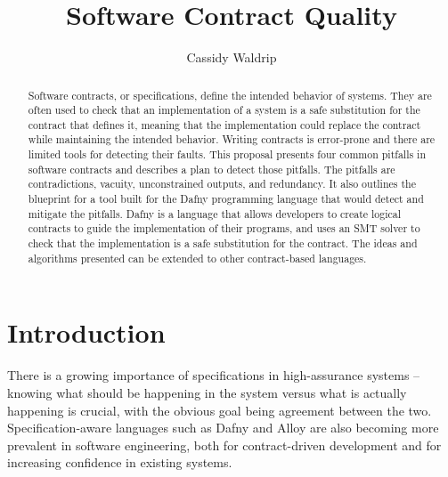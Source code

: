 \documentclass{article}
\title{Software Contract Quality}
\author{Cassidy Waldrip}
\begin{document}
\maketitle

\begin{abstract}

Software contracts, or specifications, define the intended behavior of systems. They are often used to check
that an implementation of a system is a safe substitution for the contract that defines it, meaning that the implementation could replace the contract while 
maintaining the intended behavior. 
Writing contracts is error-prone and there are limited tools for detecting their faults. This proposal presents four common
pitfalls in software contracts and describes a plan to detect those pitfalls. The pitfalls are contradictions, vacuity, unconstrained outputs, and 
redundancy.
It also outlines the blueprint for a tool built for the Dafny programming language that would detect and mitigate the pitfalls. Dafny is a language that allows 
developers to create logical contracts to guide the implementation of their programs, and uses an SMT solver to check that the implementation is a 
safe substitution for the contract. The ideas
and algorithms presented can be extended to other contract-based languages.

\end{abstract}

\section{Introduction}

There is a growing importance of specifications in high-assurance systems – knowing what should be happening
in the system versus what is actually happening is crucial, with the obvious goal being agreement
between the two. Specification-aware languages such as Dafny \cite{leino2010dafny} and Alloy \cite{jackson2002alloy} are also becoming more prevalent in
software engineering, both for contract-driven development and for increasing confidence in existing systems.
\end{document}
